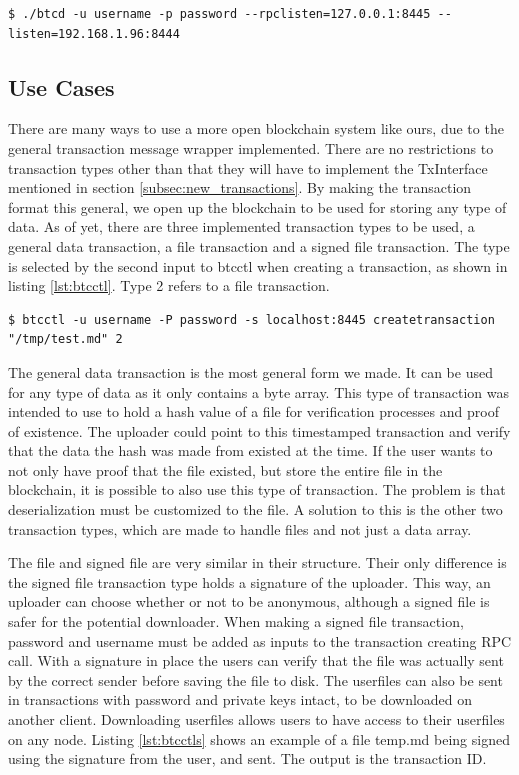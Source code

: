 \documentclass[12pt]{article}
\begin{document}
\begin{lstlisting}[float=h!,caption={Start-up command example},label=lst:start]
$ ./btcd -u username -p password --rpclisten=127.0.0.1:8445 --listen=192.168.1.96:8444 
\end{lstlisting}

\subsection{Use Cases}
There are many ways to use a more open blockchain system like ours, due to the general transaction message wrapper implemented. There are no restrictions to transaction types other than that they will have to implement the TxInterface mentioned in section \ref{subsec:new_transactions}. By making the transaction format this general, we open up the blockchain to be used for storing any type of data. As of yet, there are three implemented transaction types to be used, a general data transaction, a file transaction and a signed file transaction. The type is selected by the second input to btcctl when creating a transaction, as shown in listing \ref{lst:btcctl}. Type 2 refers to a file transaction.

\begin{lstlisting}[float=h!,caption={Transaction creation command example},label=lst:btcctl]
$ btcctl -u username -P password -s localhost:8445 createtransaction "/tmp/test.md" 2
\end{lstlisting}

The general data transaction is the most general form we made. It can be used for any type of data as it only contains a byte array. This type of transaction was intended to use to hold a hash value of a file for verification processes and proof of existence. The uploader could point to this timestamped transaction and verify that the data the hash was made from existed at the time. If the user wants to not only have proof that the file existed, but store the entire file in the blockchain, it is possible to also use this type of transaction. The problem is that deserialization must be customized to the file. A solution to this is the other two transaction types, which are made to handle files and not just a data array. 

The file and signed file are very similar in their structure. Their only difference is the signed file transaction type holds a signature of the uploader. This way, an uploader can choose whether or not to be anonymous, although a signed file is safer for the potential downloader. When making a signed file transaction, password and username must be added as inputs to the transaction creating RPC call. With a signature in place the users can verify that the file was actually sent by the correct sender before saving the file to disk. The userfiles can also be sent in transactions with password and private keys intact, to be downloaded on another client. Downloading userfiles allows users to have access to their userfiles on any node. Listing \ref{lst:btcctls} shows an example of a file temp.md being signed using the signature from the user, and sent. The output is the transaction ID.
\end{document}
